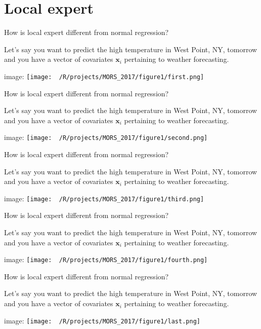 \documentclass[ignorenonframetext,]{beamer}
\begin{document}
\section{Local expert}\label{local-expert}

\begin{frame}{How is local expert different from normal regression?}

Let's say you want to predict the high temperature in West Point, NY,
tomorrow and you have a vector of covariates \(\mathbf{x}_i\) pertaining
to weather forecasting.

image: \texttt{[image: ~/R/projects/MORS\_2017/figure1/first.png]}

\end{frame}

\begin{frame}{How is local expert different from normal regression?}

Let's say you want to predict the high temperature in West Point, NY,
tomorrow and you have a vector of covariates \(\mathbf{x}_i\) pertaining
to weather forecasting.

image: \texttt{[image: ~/R/projects/MORS\_2017/figure1/second.png]}

\end{frame}

\begin{frame}{How is local expert different from normal regression?}

Let's say you want to predict the high temperature in West Point, NY,
tomorrow and you have a vector of covariates \(\mathbf{x}_i\) pertaining
to weather forecasting.

image: \texttt{[image: ~/R/projects/MORS\_2017/figure1/third.png]}

\end{frame}

\begin{frame}{How is local expert different from normal regression?}

Let's say you want to predict the high temperature in West Point, NY,
tomorrow and you have a vector of covariates \(\mathbf{x}_i\) pertaining
to weather forecasting.

image: \texttt{[image: ~/R/projects/MORS\_2017/figure1/fourth.png]}

\end{frame}

\begin{frame}{How is local expert different from normal regression?}

Let's say you want to predict the high temperature in West Point, NY,
tomorrow and you have a vector of covariates \(\mathbf{x}_i\) pertaining
to weather forecasting.

image: \texttt{[image: ~/R/projects/MORS\_2017/figure1/last.png]}

\end{frame}
\end{document}
